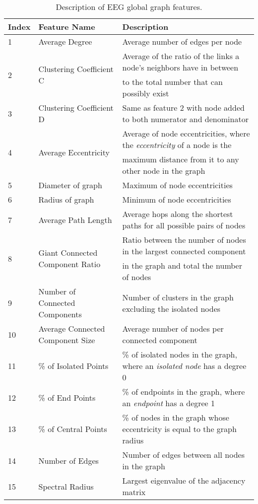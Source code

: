 \documentclass{article} %
\begin{document}
\begin{table}[htb]
\caption{Description of EEG global graph features.}\label{tab:features}
\renewcommand{\arraystretch}{0.8} %

\begin{tabular}{lll}
Index&Feature Name& Description\\
\hline
\hline
1&Average Degree&Average number of edges per node\\
\multirow{2}{*}{2}&\multirow{2}{*}{Clustering Coefficient C} &Average of the ratio of the links a node's neighbors have in between\\
&&to the total number that can possibly exist\\
3&Clustering Coefficient D & Same as feature $2$ with node added to both numerator and denominator\\
\multirow{2}{*}{4}&\multirow{2}{*}{Average Eccentricity} & Average of node eccentricities, where the {\em eccentricity} of a node is the\\
&&maximum distance from it to any other node in the graph\\
5&Diameter of graph& Maximum of node eccentricities\\
6&Radius of graph& Minimum of node eccentricities\\
7&Average Path Length &Average hops along the shortest paths for all possible pairs of nodes\\
\multirow{2}{*}{8}&\multirow{2}{*}{Giant Connected Component Ratio}& Ratio between the number of nodes in the largest connected component\\ && in the graph and total
the number of nodes\\
9&Number of Connected Components&Number of clusters in the graph excluding the isolated nodes\\
10&Average Connected Component Size&Average number of nodes per connected component \\
11&\% of Isolated Points&\% of isolated nodes in the graph, where an {\em isolated node} has a degree 0\\
12&\% of End Points&\% of endpoints in the graph, where an {\em endpoint} has a degree 1\\
13&\% of Central Points&\% of nodes in the graph whose eccentricity is equal to the graph radius\\
14&Number of Edges&Number of edges between all nodes in the graph\\
15&Spectral Radius & Largest eigenvalue of the adjacency matrix\\

\end{tabular}
\end{table}
\end{document}
